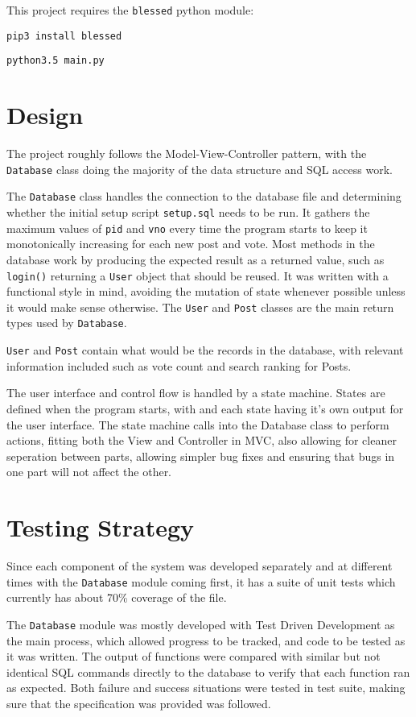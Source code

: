 \documentclass{article}
\begin{document}
This project requires the \verb|blessed| python module:

\verb|pip3 install blessed|

\verb|python3.5 main.py|

\section{Design}

The project roughly follows the Model-View-Controller pattern, with the \verb|Database| class doing the majority of the data structure and SQL access work. %

The \verb|Database| class handles the connection to the database file and determining whether the initial setup script \verb|setup.sql| needs to be run. It gathers the maximum values of \verb|pid| and \verb|vno| every time the program starts to keep it monotonically increasing for each new post and vote. Most methods in the database work by producing the expected result as a returned value, such as \verb|login()| returning a \verb|User| object that should be reused. It was written with a functional style in mind, avoiding the mutation of state whenever possible unless it would make sense otherwise. The \verb|User| and \verb|Post| classes are the main return types used by \verb|Database|.

\verb|User| and \verb|Post| contain what would be the records in the database, with relevant information included such as vote count and search ranking for Posts.

The user interface and control flow is handled by a state machine. States are defined when the program starts, with and each state having it's own output for the user interface. The state machine calls into the Database class to perform actions, fitting both the View and Controller in MVC, also allowing for cleaner seperation between parts, allowing simpler bug fixes and ensuring that bugs in one part will not affect the other.

\section{Testing Strategy}
Since each component of the system was developed separately and at different times with the \verb|Database| module coming first, it has a suite of unit tests which currently has about 70\% coverage of the file.

The \verb|Database| module was mostly developed with Test Driven Development as the main process, which allowed progress to be tracked, and code to be tested as it was written. The output of functions were compared with similar but not identical SQL commands directly to the database to verify that each function ran as expected. Both failure and success situations were tested in test suite, making sure that the specification was provided was followed.
\end{document}
